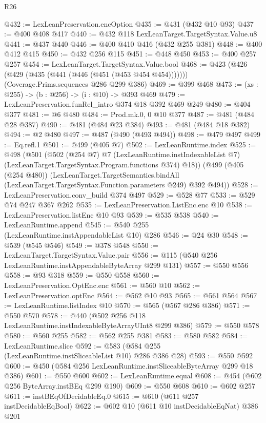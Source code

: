 \begin{lexlean}{R26}
\begin{coremodule}
{{{{{@432 := LexLeanPreservation.encOption
@435 := @431 (@432 @10 @93)
@437 := @400 @408 @417
@440 := @432 @118 LexLeanTarget.TargetSyntax.Value.u8
@441 := @437 @440
@446 := @400 @410 @416 (@432 @255 @381)
@448 := @400 @412 @415
@450 := @432 @256 @115
@451 := @448 @450
@453 := @400 @257 @257
@454 := LexLeanTarget.TargetSyntax.Value.bool
@468 := @423
    (@426 (@429 (@435 (@441 (@446 (@451 (@453 @454 @454)))))))
    (Coverage.Prims.sequences @286 @299 @386)
@469 := @399 @468
@473 := (xs : @255) -> (b : @256) -> (i : @10) -> @393 @469
@479 := LexLeanPreservation.funRel_intro @374 @18 @392 @469 @249
@480 := @404 @377
@481 := @6 @480
@484 := Prod.mk.{0, 0} @10 @377
@487 := @481 (@484 @28 @387)
@490 := @481 (@484 @23 @384)
@493 := @481 (@484 @18 @382)
@494 := @2 @480
@497 := @487 (@490 (@493 @494))
@498 := @479 @497
@499 := Eq.refl.{1}
@501 := @499 (@405 @7)
@502 := LexLeanRuntime.index
@525 := @498
    (@501
      (@502
        (@254 @7)
        @7
        (LexLeanRuntime.instIndexableList @7)
        (LexLeanTarget.TargetSyntax.Program.functions @374)
        @18))
    (@499
      (@405 (@254 @480))
      (LexLeanTarget.TargetSemantics.bindAll
        (LexLeanTarget.TargetSyntax.Function.parameters @249)
        @392
        @494))
@528 := LexLeanPreservation.conv_build @374 @497
@529 := @528 @77
@533 := @529 @74 @247 @367 @262
@535 := LexLeanPreservation.ListEnc.enc @10
@538 := LexLeanPreservation.listEnc @10 @93
@539 := @535 @538
@540 := LexLeanRuntime.append
@545 := @540 @255 (LexLeanRuntime.instAppendableList @10) @286
@546 := @24 @30
@548 := @539 (@545 @546)
@549 := @378 @548
@550 := LexLeanTarget.TargetSyntax.Value.pair
@556 := @115 (@540 @256 LexLeanRuntime.instAppendableByteArray @299 @131)
@557 := @550 @556
@558 := @93 @318
@559 := @550 @558
@560 := LexLeanPreservation.OptEnc.enc
@561 := @560 @10
@562 := LexLeanPreservation.optEnc
@564 := @562 @10 @93
@565 := @561 @564
@567 := LexLeanRuntime.listIndex @10
@570 := @565 (@567 @286 @386)
@571 := @550 @570
@578 := @440 (@502 @256 @118 LexLeanRuntime.instIndexableByteArrayUInt8 @299 @386)
@579 := @550 @578
@580 := @560 @255
@582 := @562 @255 @381
@583 := @580 @582
@584 := LexLeanRuntime.slice
@592 := @583 (@584 @255 (LexLeanRuntime.instSliceableList @10) @286 @386 @28)
@593 := @550 @592
@600 := @450 (@584 @256 LexLeanRuntime.instSliceableByteArray @299 @18 @386)
@601 := @550 @600
@602 := LexLeanRuntime.equal
@608 := @454 (@602 @256 ByteArray.instBEq @299 @190)
@609 := @550 @608
@610 := @602 @257
@611 := instBEqOfDecidableEq.{0}
@615 := @610 (@611 @257 instDecidableEqBool)
@622 := @602 @10 (@611 @10 instDecidableEqNat) @386 @201
}}}}}
\end{coremodule}
\end{lexlean}
